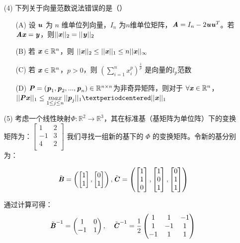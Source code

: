 \documentclass[12pt,a4paper,openany,twoside]{ctexbook}
\begin{document}
\begin{exercise}
\begin{itemize}
		\item [(4)] 下列关于向量范数说法错误的是（\quad）
		\begin{itemize}
			\item [(A)] 设 $\boldsymbol{\mathit{u}}$ 为 $n$ 维单位列向量，$I_n$ 为$n$维单位矩阵，$\boldsymbol{\mathit{A}}=I_n-2\boldsymbol{\mathit{u}}\boldsymbol{\mathit{u}}^T$。若$\boldsymbol{\mathit{A}}\boldsymbol{\mathit{x}}=\boldsymbol{\mathit{y}}$，则$||\boldsymbol{\mathit{x}}||_{2}=||\boldsymbol{\mathit{y}}||_{2}$
			\item [(B)] 若 $\boldsymbol{\mathit{x}}\in {\mathbb{R}}^n$，则 $||\boldsymbol{\mathit{x}}||_{2}\leq||\boldsymbol{\mathit{x}}||_{1}\leq n||\boldsymbol{\mathit{x}}||_{\infty}$
			\item [(C)] 若 $\boldsymbol{\mathit{x}}\in {\mathbb{R}}^n$，$p>0$，则 $(\sum_{i=1}^{n} x_i^p)^{\frac{1}{p}}$ 是向量的$l_p$范数
			\item [(D)] $\boldsymbol{\mathit{P}}=(\boldsymbol{\mathit{p}}_1,\boldsymbol{\mathit{p}}_2,...,\boldsymbol{\mathit{p}}_n)\in \mathbb{R}^{n \times n}$为非奇异矩阵，则对于 $\forall \boldsymbol{\mathit{x}}\in {\mathbb{R}}^n$，$||\MP\Vx||_1 \leq \underset {1 \leq j \leq n}{max} ||\Vp_j||_1 · ||\Vx||_1$
		\end{itemize}

		\item [(5)] 考虑一个线性映射$\Phi: \mathbb{R}^2 \to \mathbb{R}^3 $，其在标准基（基矩阵为单位阵）下的变换矩阵为：$\begin{bmatrix}
			1 & 2 \\
			-1 & 3 \\
			4 & 2  \\
			\end{bmatrix}$
			我们寻找一组新的基下的 $\Phi$ 的变换矩阵。令新的基分别为：

			$$
			\tilde{\boldsymbol{\mathit{B}}} = 
			\left(
			\begin{bmatrix}
			1 \\ 1 
			\end{bmatrix},
			\begin{bmatrix}
			0 \\ 1
			\end{bmatrix}
			\right),
			\tilde{\boldsymbol{\mathit{C}}} = 
			\left(
			\begin{bmatrix}
			1 \\ 1 \\ 0
			\end{bmatrix},
			\begin{bmatrix}
			1 \\ 0 \\ 1 
			\end{bmatrix},
			\begin{bmatrix}
			0 \\ 1 \\ 1
			\end{bmatrix}
			\right)
			$$
			
			通过计算可得：
			$$
		 {\tilde{\boldsymbol{\mathit{B}}}^{-1}} = 
			\begin{pmatrix}
			1 & 0  \\
			-1 & 1 \\
			\end{pmatrix},
			\quad
			{\tilde{\boldsymbol{\mathit{C}}}^{-1}} = 
			\frac{1}{2}
			\begin{pmatrix}
			1 & 1 & -1 \\
			1 & -1 & 1 \\
			-1 & 1 & 1 \\
			\end{pmatrix}
			$$
			

\end{itemize}
\end{exercise}
\end{document}
